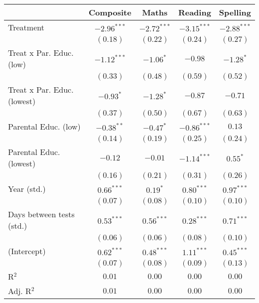 
\begin{table}
\begin{center}
\begin{tabular}{l c c c c}
\hline
 & Composite & Maths & Reading & Spelling \\
\hline
Treatment                   & $-2.96^{***}$ & $-2.72^{***}$ & $-3.15^{***}$ & $-2.88^{***}$ \\
                            & $(0.18)$      & $(0.22)$      & $(0.24)$      & $(0.27)$      \\
Treat x Par. Educ. (low)    & $-1.12^{***}$ & $-1.06^{*}$   & $-0.98$       & $-1.28^{*}$   \\
                            & $(0.33)$      & $(0.48)$      & $(0.59)$      & $(0.52)$      \\
Treat x Par. Educ. (lowest) & $-0.93^{*}$   & $-1.28^{*}$   & $-0.87$       & $-0.71$       \\
                            & $(0.37)$      & $(0.50)$      & $(0.67)$      & $(0.63)$      \\
Parental Educ. (low)        & $-0.38^{**}$  & $-0.47^{*}$   & $-0.86^{***}$ & $0.13$        \\
                            & $(0.14)$      & $(0.19)$      & $(0.25)$      & $(0.24)$      \\
Parental Educ. (lowest)     & $-0.12$       & $-0.01$       & $-1.14^{***}$ & $0.55^{*}$    \\
                            & $(0.16)$      & $(0.21)$      & $(0.31)$      & $(0.26)$      \\
Year (std.)                 & $0.66^{***}$  & $0.19^{*}$    & $0.80^{***}$  & $0.97^{***}$  \\
                            & $(0.07)$      & $(0.08)$      & $(0.10)$      & $(0.10)$      \\
Days between tests (std.)   & $0.53^{***}$  & $0.56^{***}$  & $0.28^{***}$  & $0.71^{***}$  \\
                            & $(0.06)$      & $(0.06)$      & $(0.08)$      & $(0.10)$      \\
(Intercept)                 & $0.62^{***}$  & $0.48^{***}$  & $1.11^{***}$  & $0.45^{***}$  \\
                            & $(0.07)$      & $(0.08)$      & $(0.09)$      & $(0.13)$      \\
\hline
R$^2$                       & $0.01$        & $0.00$        & $0.00$        & $0.00$        \\
Adj. R$^2$                  & $0.01$        & $0.00$        & $0.00$        & $0.00$        \\

\end{tabular}
\end{center}
\end{table}
